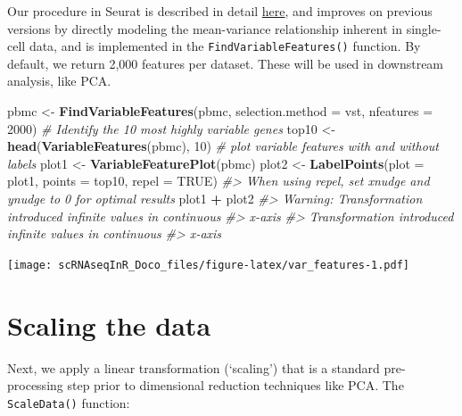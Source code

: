 \documentclass[
]{book}
\newenvironment{Shaded}{\begin{snugshade}}{\end{snugshade}}
\newcommand{\AttributeTok}[1]{\textcolor[rgb]{0.13,0.29,0.53}{#1}}
\newcommand{\CommentTok}[1]{\textcolor[rgb]{0.56,0.35,0.01}{\textit{#1}}}
\newcommand{\ConstantTok}[1]{\textcolor[rgb]{0.56,0.35,0.01}{#1}}
\newcommand{\DecValTok}[1]{\textcolor[rgb]{0.00,0.00,0.81}{#1}}
\newcommand{\FunctionTok}[1]{\textcolor[rgb]{0.13,0.29,0.53}{\textbf{#1}}}
\newcommand{\NormalTok}[1]{#1}
\newcommand{\OtherTok}[1]{\textcolor[rgb]{0.56,0.35,0.01}{#1}}
\newcommand{\SpecialCharTok}[1]{\textcolor[rgb]{0.81,0.36,0.00}{\textbf{#1}}}
\newcommand{\StringTok}[1]{\textcolor[rgb]{0.31,0.60,0.02}{#1}}
\begin{document}
Our procedure in Seurat is described in detail \href{https://doi.org/10.1016/j.cell.2019.05.031}{here}, and improves on previous versions by directly modeling the mean-variance relationship inherent in single-cell data, and is implemented in the \texttt{FindVariableFeatures()} function. By default, we return 2,000 features per dataset. These will be used in downstream analysis, like PCA.

\begin{Shaded}
\begin{Highlighting}[]
\NormalTok{pbmc }\OtherTok{\textless{}{-}} \FunctionTok{FindVariableFeatures}\NormalTok{(pbmc, }\AttributeTok{selection.method =} \StringTok{\textquotesingle{}vst\textquotesingle{}}\NormalTok{, }\AttributeTok{nfeatures =} \DecValTok{2000}\NormalTok{)}
\CommentTok{\# Identify the 10 most highly variable genes}
\NormalTok{top10 }\OtherTok{\textless{}{-}} \FunctionTok{head}\NormalTok{(}\FunctionTok{VariableFeatures}\NormalTok{(pbmc), }\DecValTok{10}\NormalTok{)}
\CommentTok{\# plot variable features with and without labels}
\NormalTok{plot1 }\OtherTok{\textless{}{-}} \FunctionTok{VariableFeaturePlot}\NormalTok{(pbmc)}
\NormalTok{plot2 }\OtherTok{\textless{}{-}} \FunctionTok{LabelPoints}\NormalTok{(}\AttributeTok{plot =}\NormalTok{ plot1, }\AttributeTok{points =}\NormalTok{ top10, }\AttributeTok{repel =} \ConstantTok{TRUE}\NormalTok{)}
\CommentTok{\#\textgreater{} When using repel, set xnudge and ynudge to 0 for optimal results}
\NormalTok{plot1 }\SpecialCharTok{+}\NormalTok{ plot2}
\CommentTok{\#\textgreater{} Warning: Transformation introduced infinite values in continuous}
\CommentTok{\#\textgreater{} x{-}axis}
\CommentTok{\#\textgreater{} Transformation introduced infinite values in continuous}
\CommentTok{\#\textgreater{} x{-}axis}
\end{Highlighting}
\end{Shaded}

\texttt{[image: scRNAseqInR\_Doco\_files/figure-latex/var\_features-1.pdf]}

\hypertarget{scaling-the-data}{%
\section{Scaling the data}\label{scaling-the-data}}

Next, we apply a linear transformation (`scaling') that is a standard pre-processing step prior to dimensional reduction techniques like PCA. The \texttt{ScaleData()} function:
\end{document}
